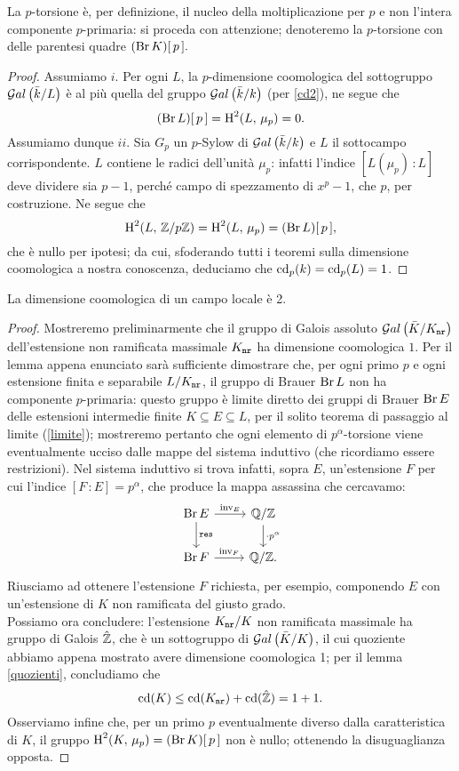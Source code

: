 La $ p $-torsione è, per definizione, il nucleo della moltiplicazione per $ p $ e non l'intera componente $ p $-primaria: si proceda con attenzione; denoteremo la $ p $-torsione con delle parentesi quadre $ (\operatorname{Br} K)[\, p \, ]. $


\begin{proof}
	Assumiamo $ i $. Per ogni $ L $, la $ p $-dimensione coomologica del sottogruppo $ \mathcal{G}al\left( \bar{k}/L \right) $ è al più quella del gruppo $ \mathcal{G}al\left( \bar{k}/k \right) $ (per \ref{cd2}), ne segue che
	\[ (\operatorname{Br} L) [\, p \,] = \operatorname{H}^2(L, \, \mu_p) = 0. \] 
	Assumiamo dunque $ ii $. Sia $ G_p $ un $ p $-Sylow di $ \mathcal{G}al\left( \bar{k}/k \right) $ e $ L $ il sottocampo corrispondente. $ L $ contiene le radici dell'unità $ \mu_p $: infatti l'indice $ [L(\mu_p)\,\colon L] $ deve dividere sia $ p-1 $, perché campo di spezzamento di $ x^p-1 $, che $ p $, per costruzione. Ne segue che
	\[ \operatorname{H}^2(L, \, \mathbb{Z}/p\mathbb{Z}) = \operatorname{H}^2(L, \, \mu_p) = (\operatorname{Br} L)[\, p\,], \]
	che è nullo per ipotesi; da cui, sfoderando tutti i teoremi sulla dimensione coomologica a nostra conoscenza, deduciamo che $ \operatorname{cd}_p(k) = \operatorname{cd}_p(L) = 1 $.
\end{proof}


\begin{theorem}\label{cdim2}
	La dimensione coomologica di un campo locale è 2.
\end{theorem}
\begin{proof}
	Mostreremo preliminarmente che il gruppo di Galois assoluto $ \mathcal{G}al\left( \bar{K}/K_\mathtt{nr} \right) $ dell'estensione non ramificata massimale $ K_\mathtt{nr} $ ha dimensione coomologica $ 1 $. Per il lemma appena enunciato sarà sufficiente dimostrare che, per ogni primo $ p $ e ogni estensione finita e separabile $ L/K_\mathtt{nr} $, il gruppo di Brauer $ \operatorname{Br} L $ non ha componente $ p $-primaria: questo gruppo è limite diretto dei gruppi di Brauer $ \operatorname{Br} E $ delle estensioni intermedie finite $ K \subseteq E \subseteq L $, per il solito teorema di passaggio al limite (\ref{limite}); mostreremo pertanto che ogni elemento di $ p^\alpha $-torsione viene eventualmente ucciso dalle mappe del sistema induttivo (che ricordiamo essere restrizioni). Nel sistema induttivo si trova infatti, sopra $ E $, un'estensione $ F $ per cui l'indice $ [F \,\colon E] = p^\alpha $, che produce la mappa assassina che cercavamo:
	\[ \begin{tikzcd}
	\Br E \rar["\inv_E"] \dar["\Res"]
	& \Q/\Z \dar["\cdot p^\alpha"] \\
	\Br F \rar["\inv_F"]
	& \Q/\Z.
	\end{tikzcd} \]
	Riusciamo ad ottenere l'estensione $ F $ richiesta, per esempio, componendo $ E $ con un'estensione di $ K $ non ramificata del giusto grado.\\
	
	Possiamo ora concludere: l'estensione $ K_\mathtt{nr} /K $ non ramificata massimale ha gruppo di Galois $ \hat{\mathbb{Z}} $, che è un sottogruppo di $ \mathcal{G}al\left( \bar{K}/K \right) $, il cui quoziente abbiamo appena mostrato avere dimensione coomologica 1; per il lemma \ref{quozienti}, concludiamo che 
	$$  \operatorname{cd}(K) \leq \operatorname{cd}(K_\mathtt{nr}) + \operatorname{cd}(\hat{\mathbb{Z}}) = 1+1.  $$
	Osserviamo infine che, per un primo $ p $ eventualmente diverso dalla caratteristica di $ K $, il gruppo $ \operatorname{H}^2(K, \, \mu_p) = (\operatorname{Br} K)[\, p\, ] $ non è nullo; ottenendo la disuguaglianza opposta.
\end{proof}

